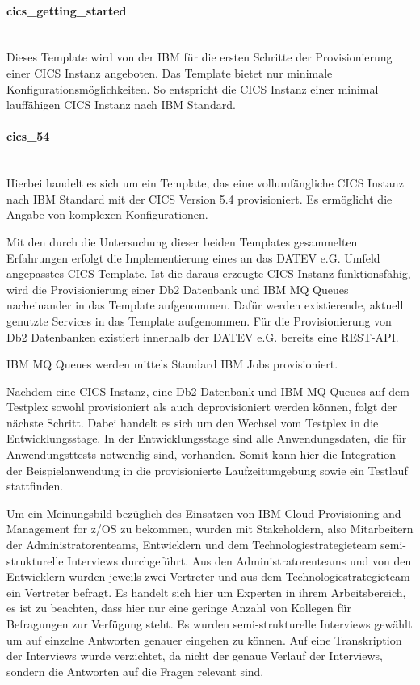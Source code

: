 \paragraph{\glqq cics\_getting\_started\grqq}~\\
Dieses Template wird von der IBM für die ersten Schritte der Provisionierung einer CICS Instanz angeboten.
Das Template bietet nur minimale Konfigurationsmöglichkeiten.
So entspricht die CICS Instanz einer minimal lauffähigen CICS Instanz nach IBM Standard.

\paragraph{\glqq cics\_54\grqq}~\\
Hierbei handelt es sich um ein Template, das eine vollumfängliche CICS Instanz nach IBM Standard mit der CICS Version 5.4 provisioniert.
Es ermöglicht die Angabe von komplexen Konfigurationen.

Mit den durch die Untersuchung dieser beiden Templates gesammelten Erfahrungen erfolgt die Implementierung eines an das DATEV e.G. Umfeld angepasstes CICS Template.
Ist die daraus erzeugte CICS Instanz funktionsfähig, wird die Provisionierung einer Db2 Datenbank und IBM MQ Queues nacheinander in das Template aufgenommen. 
Dafür werden existierende, aktuell genutzte Services in das Template aufgenommen.
Für die Provisionierung von Db2 Datenbanken existiert innerhalb der DATEV e.G. bereits eine REST-API.

IBM MQ Queues werden mittels Standard IBM Jobs provisioniert.

Nachdem eine CICS Instanz, eine Db2 Datenbank und IBM MQ Queues auf dem Testplex sowohl provisioniert als auch deprovisioniert werden können, folgt der nächste Schritt.
Dabei handelt es sich um den Wechsel vom Testplex in die Entwicklungsstage.
In der Entwicklungsstage sind alle Anwendungsdaten, die für Anwendungsttests notwendig sind, vorhanden.
Somit kann hier die Integration der Beispielanwendung in die provisionierte Laufzeitumgebung sowie ein Testlauf stattfinden.

Um ein Meinungsbild bezüglich des Einsatzen von \glqq IBM Cloud Provisioning and Management for z/OS\grqq{} zu bekommen, wurden mit Stakeholdern, also Mitarbeitern der Administratorenteams, Entwicklern und dem Technologiestrategieteam semi-strukturelle Interviews durchgeführt.
Aus den Administratorenteams und von den Entwicklern wurden jeweils zwei Vertreter und aus dem Technologiestrategieteam ein Vertreter befragt.
Es handelt sich hier um Experten in ihrem Arbeitsbereich, es ist zu beachten, dass hier nur eine geringe Anzahl von Kollegen für Befragungen zur Verfügung steht.
Es wurden semi-strukturelle Interviews gewählt um auf einzelne Antworten genauer eingehen zu können.
Auf eine Transkription der Interviews wurde verzichtet, da nicht der genaue Verlauf der Interviews, sondern die Antworten auf die Fragen relevant sind.

